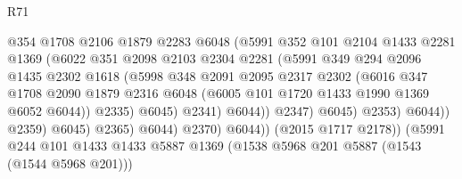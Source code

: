 \begin{lexlean}{R71}
\begin{coremodule}
                                    @354
                                    @1708
                                    @2106
                                    @1879
                                    @2283
                                    @6048
                                    (@5991
                                      @352
                                      @101
                                      @2104
                                      @1433
                                      @2281
                                      @1369
                                      (@6022
                                        @351
                                        @2098
                                        @2103
                                        @2304
                                        @2281
                                        (@5991
                                          @349
                                          @294
                                          @2096
                                          @1435
                                          @2302
                                          @1618
                                          (@5998
                                            @348
                                            @2091
                                            @2095
                                            @2317
                                            @2302
                                            (@6016
                                              @347
                                              @1708
                                              @2090
                                              @1879
                                              @2316
                                              @6048
                                              (@6005 @101 @1720 @1433 @1990 @1369 @6052 @6044))
                                            @2335)
                                          @6045)
                                        @2341)
                                      @6044))
                                  @2347)
                                @6045)
                              @2353)
                            @6044))
                        @2359)
                      @6045)
                    @2365)
                  @6044)
                @2370)
              @6044))
          (@2015 @1717 @2178))
        (@5991
          @244
          @101
          @1433
          @1433
          @5887
          @1369
          (@1538 @5968 @201 @5887 (@1543 (@1544 @5968 @201)))

\end{coremodule}
\end{lexlean}
